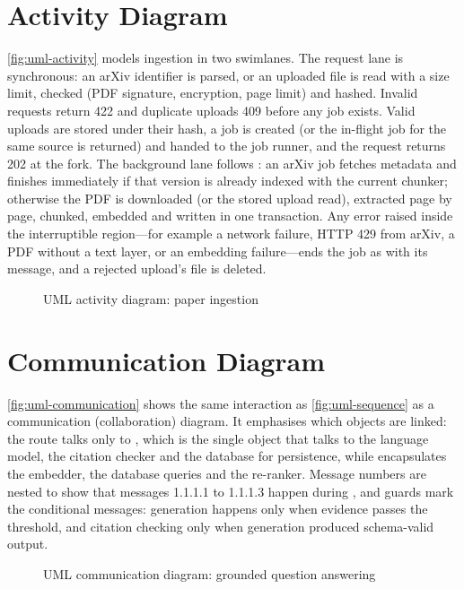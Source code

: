 \section{Activity Diagram}

\autoref{fig:uml-activity} models ingestion in two swimlanes. The request lane is synchronous: an arXiv identifier is
parsed, or an uploaded file is read with a size limit, checked (PDF signature, encryption, page limit) and hashed.
Invalid requests return 422 and duplicate uploads 409 before any job exists. Valid uploads are stored under their
hash, a job is created (or the in-flight job for the same source is returned) and handed to the job runner, and the
request returns 202 at the fork. The background lane follows : an arXiv job fetches metadata and
finishes immediately if that version is already indexed with the current chunker; otherwise the PDF is downloaded
(or the stored upload read), extracted page by page, chunked, embedded and written in one transaction. Any error
raised inside the interruptible region---for example a network failure, HTTP 429 from arXiv, a PDF without a text
layer, or an embedding failure---ends the job as  with its message, and a rejected upload's file is
deleted.

\begin{figure}[htbp]
  \centering
  \caption{UML activity diagram: paper ingestion}\label{fig:uml-activity}
\end{figure}

\section{Communication Diagram}

\autoref{fig:uml-communication} shows the same interaction as \autoref{fig:uml-sequence} as a communication
(collaboration) diagram. It emphasises which objects are linked: the route talks only to , which is
the single object that talks to the language model, the citation checker and the database for persistence, while
 encapsulates the embedder, the database queries and the re-ranker. Message numbers are nested
to show that messages 1.1.1.1 to 1.1.1.3 happen during , and guards mark the conditional messages:
generation happens only when evidence passes the threshold, and citation checking only when generation produced
schema-valid output.

\begin{figure}[htbp]
  \centering
  \caption{UML communication diagram: grounded question answering}\label{fig:uml-communication}
\end{figure}

